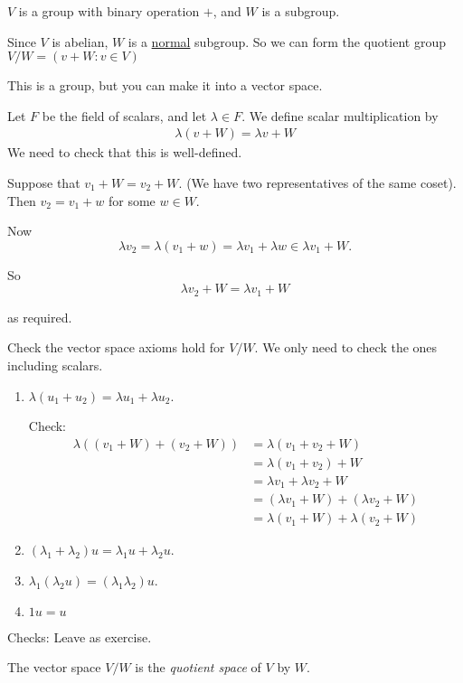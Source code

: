 \documentclass{article}
\theoremstyle{definition} \newtheorem*{definition}{Definition}
\begin{document}
  $V$ is a group with binary operation $+$, and $W$ is a subgroup.
 
  Since $V$ is abelian, $W$ is a \underline{normal} subgroup. So we can form the quotient group $V/W = \left( v+W : v \in V \right)$

  This is a group, but you can make it into a vector space.

  Let $F$ be the field of scalars, and let $\lambda \in F$. We define 
  scalar multiplication by
  \begin{align*}
    \lambda(v + W) = \lambda v + W
  \end{align*}
We need to check that this is well-defined.

Suppose that $v_1 + W = v_2 + W$. (We have two representatives of the same
coset). Then $v_2 = v_1 + w$ for some $w \in W$. 

Now \[
\lambda v_2 = \lambda (v_1 + w) = \lambda v_1 + \lambda w \in \lambda v_1
+ W.\]

So \[
  \lambda v_2 + W = \lambda v_1 + W
\]

as required.

Check the vector space axioms hold for $V/W$. We only need to check the ones including scalars.

\begin{enumerate}
  \item 
    $\lambda (u_1 + u_2) = \lambda u_1 + \lambda u_2$.

    Check: 
    \begin{align*}
    \lambda \left( (v_1 + W) + (v_2 + W) \right) &= \lambda \left( v_1 +
    v_2 + W \right) \\
     &= \lambda (v_1 + v_2) + W \\ &= \lambda v_1 + \lambda v_2 + W\\
     &= (\lambda v_1 + W) + (\lambda v_2 + W) \\ &= \lambda(v_1 + W) + \lambda(v_2 + W)
    \end{align*}
  \item
$(\lambda_1 + \lambda_2)u = \lambda_1 u + \lambda_2 u$.
  \item
$\lambda_1 ( \lambda_2u) = (\lambda_1 \lambda_2) u$.
  \item 
$1u = u$
\end{enumerate}

Checks: Leave as exercise.

The vector space $V/W$ is the \emph{quotient space} of $V$ by $W$.
\end{document}
